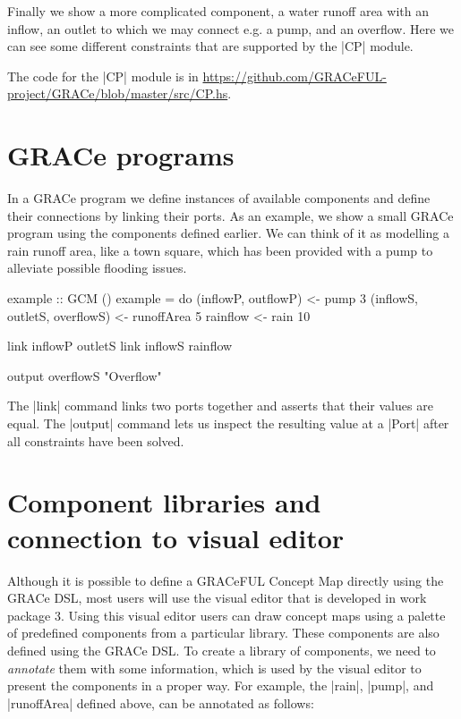 \documentclass[a4paper]{article}
\begin{document}
Finally we show a more complicated component, a water runoff area with an
inflow, an outlet to which we may connect e.g. a pump, and an overflow. Here we
can see some different constraints that are supported by the |CP| module.

The code for the |CP| module is in \url{https://github.com/GRACeFUL-project/GRACe/blob/master/src/CP.hs}.
\section{GRACe programs}

In a GRACe program we define instances of available components and define their
connections by linking their ports. As an example, we show a small GRACe program
using the components defined earlier. We can think of it as modelling a rain
runoff area, like a town square, which has been provided with a pump to
alleviate possible flooding issues.
\begin{haskellcode}
example :: GCM ()
example = do
  (inflowP, outflowP) <- pump 3
  (inflowS, outletS, overflowS) <- runoffArea 5
  rainflow <- rain 10

  link inflowP outletS
  link inflowS rainflow

  output overflowS "Overflow"
\end{haskellcode}
The |link| command links two ports together and asserts that their values are
equal. The |output| command lets us inspect the resulting value at a |Port|
after all constraints have been solved.

\section{Component libraries and connection to visual editor}
Although it is possible to define a GRACeFUL Concept Map directly using the
GRACe DSL, most users will use the visual editor that is developed in work
package 3. Using this visual editor users can draw concept maps using a palette
of predefined components from a particular library. These components are also
defined using the GRACe DSL. To create a library of components, we need to
\emph{annotate} them with some information, which is used by the visual editor
to present the components in a proper way. For example, the |rain|, |pump|, and
|runoffArea| defined above, can be annotated as follows:
\end{document}
